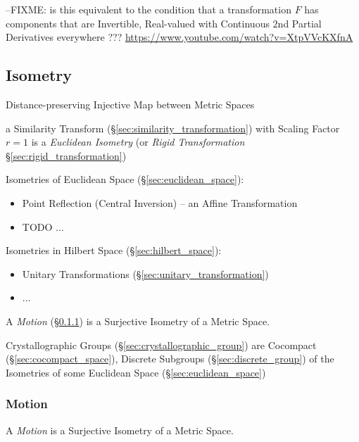 --FIXME: is this equivalent to the condition that a transformation $F$ has
components that are Invertible, Real-valued with Continuous $2$nd Partial
Derivatives everywhere ???
\url{https://www.youtube.com/watch?v=XtpVVcKXfnA}



\subsection{Isometry}\label{sec:isometry}

Distance-preserving Injective Map between Metric Spaces

a Similarity Transform (\S\ref{sec:similarity_transformation}) with Scaling
Factor $r = 1$ is a \emph{Euclidean Isometry} (or \emph{Rigid Transformation}
\S\ref{sec:rigid_transformation})

Isometries of Euclidean Space (\S\ref{sec:euclidean_space}):
\begin{itemize}
  \item Point Reflection (Central Inversion) -- an Affine Transformation
  \item TODO
  ...
\end{itemize}

Isometries in Hilbert Space (\S\ref{sec:hilbert_space}):
\begin{itemize}
  \item Unitary Transformations (\S\ref{sec:unitary_transformation})
  \item ...
\end{itemize}

A \emph{Motion} (\S\ref{sec:motion}) is a Surjective Isometry of a Metric
Space.

Crystallographic Groups (\S\ref{sec:crystallographic_group}) are Cocompact
(\S\ref{sec:cocompact_space}), Discrete Subgroups (\S\ref{sec:discrete_group})
of the Isometries of some Euclidean Space (\S\ref{sec:euclidean_space})



\subsubsection{Motion}\label{sec:motion}


A \emph{Motion} is a Surjective Isometry of a Metric Space.



